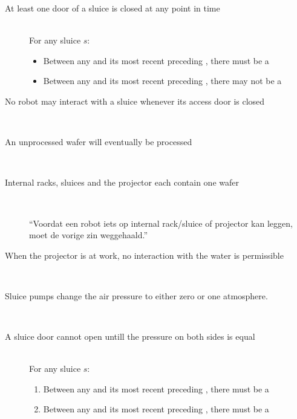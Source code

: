 
\begin{description}
 \item[At least one door of a sluice is closed at any point in time] \hfill \\
 For any sluice $s$:
 \begin{itemize}
  \item Between any  and its most recent preceding , there must be a 
  \item Between any  and its most recent preceding , there may not be a 
 \end{itemize}

 \item[No robot may interact with a sluice whenever its access door is closed] \hfill \\
 
 \item[An unprocessed wafer will eventually be processed] \hfill \\
 
 \item[Internal racks, sluices and the projector each contain one wafer] \hfill \\
 
 ``Voordat een robot iets op internal rack/sluice of projector kan leggen, moet de vorige zin weggehaald.''
 
 \item[When the projector is at work, no interaction with the water is permissible] \hfill \\
 
 
 
 \item[Sluice pumps change the air pressure to either zero or one atmosphere.] \hfill \\
 
 \item[A sluice door cannot open untill the pressure on both sides is equal] \hfill \\
 For any sluice $s$:
 \begin{enumerate}
  \item Between any  and its most recent preceding , there must be a 
  \item Between any  and its most recent preceding , there must be a 
 \end{enumerate}


\end{description}
